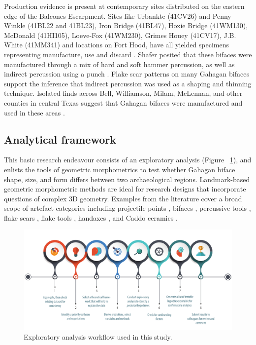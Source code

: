 \documentclass[review]{elsarticle}
\begin{document}
Production evidence is present at contemporary sites distributed on the eastern edge of the Balcones Escarpment. Sites like Urbankte (41CV26) and Penny Winkle (41BL22 and 41BL23), Iron Bridge (41BL47), Hoxie Bridge (41WM130), McDonald (41HI105), Loeve-Fox (41WM230), Grimes Houey (41CV17), J.B. White (41MM341) and locations on Fort Hood, have all yielded specimens representing manufacture, use and discard \citep{RN20717,RN11565,RN2708,RN20718,RN4924,RN20719}. Shafer posited that these bifaces were manufactured through a mix of hard and soft hammer percussion, as well as indirect percussion using a punch \citep{RN4924,RN3684}. Flake scar patterns on many Gahagan bifaces support the inference that indirect percussion was used as a shaping and thinning technique. Isolated finds across Bell, Williamson, Milam, McLennan, and other counties in central Texas suggest that Gahagan bifaces were manufactured and used in these areas \citep{RN4924}.

\subsection*{Analytical framework}

This basic research endeavour \citep{RN20851} consists of an exploratory analysis (Figure ~\ref{fig:exan}), and enlists the tools of geometric morphometrics to test whether Gahagan biface shape, size, and form differs between two archaeological regions. Landmark-based geometric morphometric methods are ideal for research designs that incorporate questions of complex 3D geometry. Examples from the literature cover a broad scope of artefact categories including projectile points \citep{RN1750,RN1755}, bifaces \citep{RN1727,RN4392,RN11550,RN11783}, percussive tools \citep{RN1772}, flake scars \citep{RN253}, flake tools \citep{RN11552}, handaxes \citep{RN1730,RN1766,RN3145,RN1733,RN335}, and Caddo ceramics \citep{RN1994,RN11521,RN11782,RN11801,RN11716,RN20852}.

\begin{figure}[ht]\centering
\includegraphics[width=\linewidth]{figexan.pdf}
\caption{Exploratory analysis workflow used in this study.}
\label{fig:exan}
\end{figure}
\end{document}
